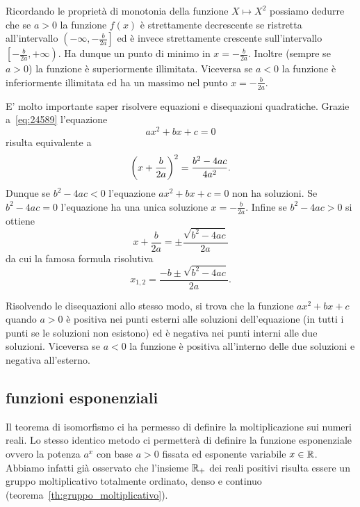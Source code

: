 Ricordando le proprietà di monotonia della funzione $X\mapsto X^2$
possiamo dedurre che se $a>0$ la funzione $f(x)$ è strettamente
decrescente se ristretta all'intervallo 
$\left(-\infty,-\frac b {2a}\right]$ ed è invece strettamente crescente 
sull'intervallo $\left[-\frac b{2a},+\infty\right)$. 
Ha dunque un punto di minimo in $x=-\frac{b}{2a}$.
Inoltre (sempre se $a>0$) la funzione è superiormente illimitata.
Viceversa se $a<0$ la funzione è inferiormente illimitata ed ha 
un massimo nel punto $x=-\frac{b}{2a}$.

E' molto importante saper risolvere equazioni e disequazioni
quadratiche. Grazie a~\eqref{eq:24589} l'equazione
\[
 a x^2 + bx + c = 0
\]
risulta equivalente a
\[
  {\left( x+\frac{b}{2a} \right)}^2 = \frac{b^2-4ac}{4a^2}.
\]
Dunque se $b^2-4ac<0$ l'equazione $ax^2+bx+c=0$ non ha soluzioni.
Se $b^2-4ac=0$ l'equazione ha una unica soluzione $x=-\frac{b}{2a}$.
Infine se $b^2-4ac>0$ si ottiene
\[
  x+\frac b{2a} = \pm \frac{\sqrt{b^2-4ac}}{2a}
\]
da cui la famosa formula risolutiva
\mymark{***}
\begin{equation}\label{eq:secondo_grado}
  x_{1,2} = \frac{-b \pm \sqrt{b^2-4ac}}{2a}.
\end{equation}

Risolvendo le disequazioni allo stesso modo, si trova
che la funzione $ax^2+bx+c$ quando $a>0$ è positiva
nei punti esterni alle soluzioni dell'equazione
(in tutti i punti se le soluzioni non esistono) ed
è negativa nei punti interni alle due soluzioni.
Viceversa se $a<0$ la funzione è positiva all'interno
delle due soluzioni e negativa all'esterno.


\subsection{funzioni esponenziali}
%
%
\label{sec:esponenziale}%

Il teorema di isomorfismo ci ha permesso di definire la moltiplicazione sui 
numeri reali. 
Lo stesso identico metodo ci permetterà di definire la funzione esponenziale
ovvero la potenza $a^x$ con base $a>0$ fissata ed esponente variabile $x\in {\mathbb R}$.
Abbiamo infatti già osservato che l'insieme ${\mathbb R}_+$ dei reali positivi
risulta essere un gruppo moltiplicativo totalmente ordinato, denso e continuo 
(teorema~\ref{th:gruppo_moltiplicativo}).

